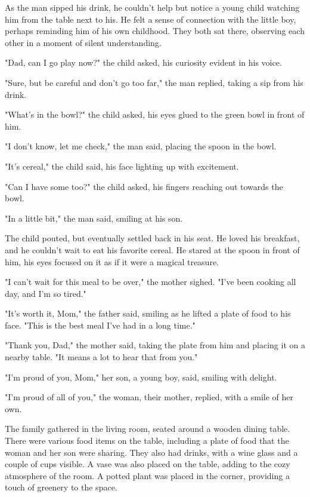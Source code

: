 \documentclass[smalldemyvopaper,11pt,twoside,onecolumn,openright,extrafontsizes]{memoir}
\begin{document}
As the man sipped his drink, he couldn't help but notice a young child watching him from the table next to his. He felt a sense of connection with the little boy, perhaps reminding him of his own childhood. They both sat there, observing each other in a moment of silent understanding.\par
"Dad, can I go play now?" the child asked, his curiosity evident in his voice.\par
"Sure, but be careful and don't go too far," the man replied, taking a sip from his drink.\par
"What's in the bowl?" the child asked, his eyes glued to the green bowl in front of him.\par
"I don't know, let me check," the man said, placing the spoon in the bowl.\par
"It's cereal," the child said, his face lighting up with excitement.\par
"Can I have some too?" the child asked, his fingers reaching out towards the bowl.\par
"In a little bit," the man said, smiling at his son.\par
The child pouted, but eventually settled back in his seat. He loved his breakfast, and he couldn't wait to eat his favorite cereal. He stared at the spoon in front of him, his eyes focused on it as if it were a magical treasure.\par
"I can't wait for this meal to be over," the mother sighed. "I've been cooking all day, and I'm so tired."\par
"It's worth it, Mom," the father said, smiling as he lifted a plate of food to his face. "This is the best meal I've had in a long time."\par
"Thank you, Dad," the mother said, taking the plate from him and placing it on a nearby table. "It means a lot to hear that from you."\par
"I'm proud of you, Mom," her son, a young boy, said, smiling with delight.\par
"I'm proud of all of you," the woman, their mother, replied, with a smile of her own.\par
The family gathered in the living room, seated around a wooden dining table. There were various food items on the table, including a plate of food that the woman and her son were sharing. They also had drinks, with a wine glass and a couple of cups visible. A vase was also placed on the table, adding to the cozy atmosphere of the room. A potted plant was placed in the corner, providing a touch of greenery to the space.\par
\end{document}

